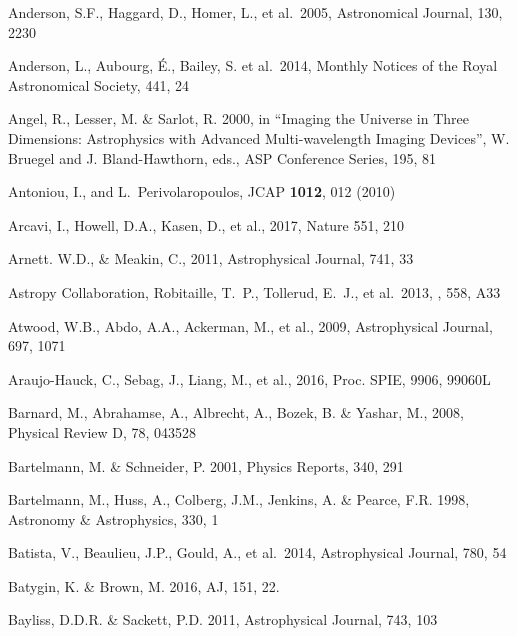 \documentclass[twocolumn]{aastex61}
\begin{document}
\begin{thebibliography}{}
 Anderson, S.F., Haggard, D., Homer, L., et al.~2005, Astronomical Journal, 130, 2230

 Anderson, L., Aubourg, \'E., Bailey, S. et al.~2014, Monthly Notices of the Royal Astronomical Society, 441, 24

 Angel, R., Lesser, M. \& Sarlot, R. 2000, in  ``Imaging the Universe in Three Dimensions: Astrophysics with Advanced Multi-wavelength Imaging Devices'', W. Bruegel and J. Bland-Hawthorn, eds., ASP Conference Series, 195, 81

 Antoniou, I., and L.~Perivolaropoulos, JCAP {\bf 1012}, 012 (2010)

 Arcavi, I., Howell, D.A., Kasen, D., et al., 2017, Nature 551, 210

 Arnett. W.D., \& Meakin, C., 2011, Astrophysical Journal, 741, 33

 Astropy Collaboration, Robitaille, T.~P., Tollerud, E.~J., et al.\ 2013, \aap, 558, A33

 Atwood, W.B., Abdo, A.A., Ackerman, M., et al., 2009, Astrophysical Journal, 697, 1071

 Araujo-Hauck, C., Sebag, J., Liang, M., et al., 2016,  Proc. SPIE, 9906, 99060L

 Barnard, M., Abrahamse, A., Albrecht, A., Bozek, B. \& Yashar, M., 2008, Physical Review D, 78, 043528

 Bartelmann, M. \& Schneider, P. 2001, Physics Reports, 340, 291

 Bartelmann, M., Huss, A., Colberg, J.M., Jenkins, A. \& Pearce, F.R. 1998, Astronomy \& Astrophysics, 330, 1

 Batista, V., Beaulieu, J.P., Gould, A., et al.~2014, Astrophysical Journal, 780, 54

 Batygin, K. \& Brown, M. 2016, AJ, 151, 22.

 Bayliss, D.D.R. \& Sackett, P.D. 2011, Astrophysical Journal, 743, 103


\end{thebibliography}
\end{document}

